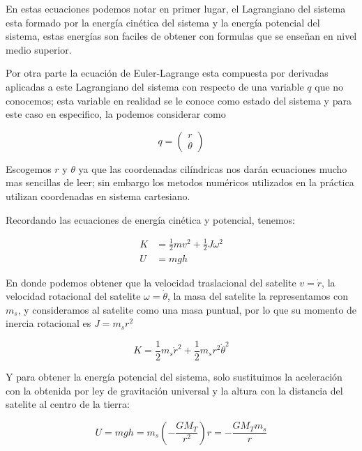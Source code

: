 \documentclass{article}
\begin{document}
    En estas ecuaciones podemos notar en primer lugar, el Lagrangiano del
sistema esta formado por la energía cinética del sistema y la energía
potencial del sistema, estas energías son faciles de obtener con
formulas que se enseñan en nivel medio superior.

Por otra parte la ecuación de Euler-Lagrange esta compuesta por
derivadas aplicadas a este Lagrangiano del sistema con respecto de una
variable \(q\) que no conocemos; esta variable en realidad se le conoce
como estado del sistema y para este caso en especifico, la podemos
considerar como

    \begin{equation}
q = 
\begin{pmatrix}
r \\
\theta
\end{pmatrix}
\end{equation}

    Escogemos \(r\) y \(\theta\) ya que las coordenadas cilíndricas nos
darán ecuaciones mucho mas sencillas de leer; sin embargo los metodos
numéricos utilizados en la práctica utilizan coordenadas en sistema
cartesiano.

Recordando las ecuaciones de energía cinética y potencial, tenemos:

    \begin{align}
K &= \frac{1}{2} m v^2 + \frac{1}{2} J \omega^2\\
U &= mgh
\end{align}

    En donde podemos obtener que la velocidad traslacional del satelite
\(v = \dot{r}\), la velocidad rotacional del satelite
\(\omega = \dot{\theta}\), la masa del satelite la representamos con
\(m_s\), y consideramos al satelite como una masa puntual, por lo que su
momento de inercia rotacional es \(J = m_s r^2\)

    \begin{equation}
K = \frac{1}{2} m_s \dot{r}^2 + \frac{1}{2} m_s r^2 \dot{\theta}^2
\end{equation}

    Y para obtener la energía potencial del sistema, solo sustituimos la
aceleración con la obtenida por ley de gravitación universal y la altura
con la distancia del satelite al centro de la tierra:

    \begin{equation}
U = mgh = m_s \left( -\frac{G M_T}{r^2} \right) r = - \frac{G M_T m_s}{r}
\end{equation}
\end{document}
